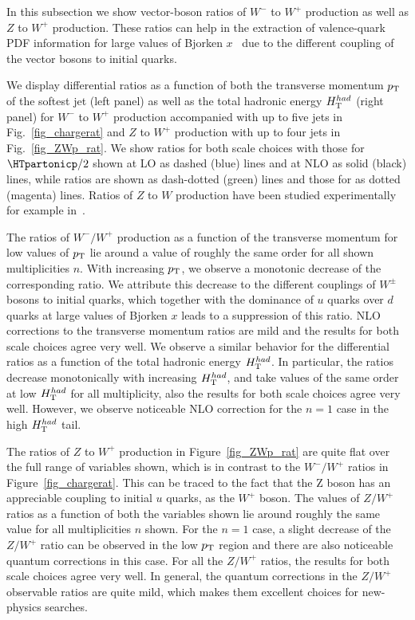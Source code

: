 
In this subsection we show vector-boson ratios of $W^-$ to $W^+$ production as well as
$Z$ to $W^+$ production. These ratios can help in the extraction of valence-quark PDF information for large values
of Bjorken $x$~\cite{BH:Wratios,Kom:2010mv} due to the different coupling of the vector bosons to initial quarks.


We display differential ratios as a function of both the transverse
momentum $p_{\textrm T}$ of the softest jet (left panel) as well as the total hadronic
energy $H_{\textrm T}^{had}$ (right panel) for $W^-$ to $W^+$ production accompanied with
up to five jets in Fig.~\ref{fig_chargerat} and $Z$ to $W^+$ production with up to four jets in Fig.~\ref{fig_ZWp_rat}. We show ratios for both scale choices with
those for $\HTpartonicp/2$ shown at LO as dashed (blue)
lines and at NLO as solid (black) lines, while \MILOp{} ratios are
shown as dash-dotted (green) lines and those for \MINLOp{} as
dotted (magenta) lines. Ratios of $Z$ to $W$ production have been studied experimentally for example
in~\cite{Chatrchyan:2011ne}.


The ratios of $W^-/W^+$ production as a function of the transverse momentum for low values of $p_{\textrm T}$ lie around a value of roughly the same
order for all
shown multiplicities $n$. With increasing $p_{\textrm T}$, we observe a monotonic
decrease of the corresponding ratio. We attribute this decrease to the different couplings of $W^\pm$ bosons to initial quarks, which together with the
dominance of $u$ quarks over $d$ quarks at large values of Bjorken
$x$ leads to a suppression of this ratio. NLO corrections to the transverse momentum ratios are
mild and the results for both scale choices agree very well. We observe a similar behavior for the differential ratios as a function of the total
hadronic energy $H_{\textrm T}^{had}$. In particular, the ratios decrease
monotonically with increasing $H_{\textrm T}^{had}$, 
and take values of the same order at low $H_{\textrm T}^{had}$ for all
multiplicity, also the results for both scale choices agree very
well. However, we observe noticeable NLO correction for the $n=1$ case in
the high $H_{\textrm T}^{had}$ tail.


The ratios of $Z$ to $W^+$ production in Figure~\ref{fig_ZWp_rat} are
quite flat over the full range of variables shown, which is in
contrast to the $W^-/W^+$ ratios in
Figure~\ref{fig_chargerat}. This can be traced to the fact that the Z boson has an appreciable
coupling to initial $u$ quarks, as the $W^+$ boson. The values of $Z/W^+$ ratios as a function
of both the variables shown lie around roughly the same value for all multiplicities $n$ shown. For the $n=1$ case, a slight decrease of the $Z/W^+$ ratio can be observed in the low
$p_{\textrm T}$ region and there are also noticeable quantum corrections in this case. For all the $Z/W^+$
ratios, the results for both scale choices agree very well. In general, the quantum corrections in the $Z/W^+$ observable ratios are
quite mild, which makes them excellent choices for new-physics searches.

